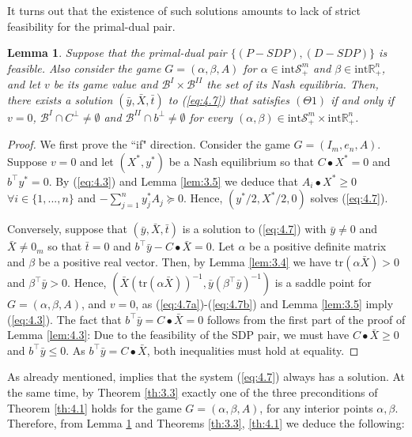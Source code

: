 \documentclass[11pt, twoside]{article}
\numberwithin{equation}{section}
\newtheorem{lemma}{Lemma}[section]
\theoremstyle{definition}
\begin{document}
It turns out that the existence of such solutions amounts to lack of strict feasibility for the primal-dual pair.

\begin{lemma}\label{lem:theta1}
    Suppose that the primal-dual pair \hyperlink{primaldualsdp}{$\{(P-SDP),(D-SDP)\}$} is feasible. Also consider the game $G=(\alpha,\beta,A)$ for $\alpha\in\text{int}\mathcal{S}^{m}_{+}$ and $\beta\in\text{int}\mathbb{R}^{n}_{+}$, and let $v$ be its game value and $\mathcal{B}^I\times\mathcal{B}^{II}$ the set of its Nash equilibria. Then, there exists a solution $(\bar{y},\bar{X},\bar{t})$ to (\ref{eq:4.7}) that satisfies \hyperlink{theta1}{$(\Theta1)$} if and only if $v=0$, $\mathcal{B}^I\cap C^{\perp}\neq\emptyset$ and $\mathcal{B}^{II}\cap b^{\perp}\neq\emptyset$ for every $(\alpha,\beta)\in \text{int}\mathcal{S}^{m}_{+}\times\text{int} \mathbb{R}^{n}_{+}$.
\end{lemma}

\begin{proof}
    We first prove the ``if" direction. Consider the game $G=(I_m,e_n,A)$. Suppose $v=0$ and let $(X^*,y^*)$ be a Nash equilibrium so that $C\bullet X^*=0$ and $b^\top y^*=0$. By (\ref{eq:4.3}) and Lemma \ref{lem:3.5} we deduce that $A_i\bullet X^*\geq 0$ $\forall i\in\{1,...,n\}$ and $-\sum\limits_{j=1}^{n} y^*_j A_j\succeq 0$. Hence, $(y^*/2,X^*/2,0)$ solves (\ref{eq:4.7}).\par 
    Conversely, suppose that $(\bar{y},\bar{X},\bar{t})$ is a solution to (\ref{eq:4.7})  with $\bar{y}\neq 0$ and $\bar{X}\neq 0_m$ so that $\bar{t}=0$ and $b^\top \bar{y}-C\bullet \bar{X}=0$. Let $\alpha$ be a positive definite matrix and $\beta$ be a positive real vector. Then, by Lemma \ref{lem:3.4} we have $\text{tr}(\alpha \bar{X})>0$ and $\beta^\top \bar{y}>0$. Hence, $\left(\bar{X}(\text{tr}(\alpha \bar{X}))^{-1},\bar{y} (\beta^\top\bar{y})^{-1}\right)$ is a saddle point for $G=(\alpha,\beta,A)$, and $v=0$, as (\ref{eq:4.7a})-(\ref{eq:4.7b}) and Lemma \ref{lem:3.5} imply (\ref{eq:4.3}). The fact that $b^\top\bar{y}=C\bullet \bar{X}=0$ follows from the first part of the proof of Lemma \ref{lem:4.3}: Due to the feasibility of the SDP pair, we must have $C\bullet \bar{X}\geq 0$ and $b^\top \bar{y}\leq 0$. As $b^\top \bar{y}= C\bullet \bar{X}$, both inequalities must hold at equality.
\end{proof}

As already mentioned, \cite[Lemma 5.2]{ickstadt2024semidefinite} implies that the system (\ref{eq:4.7}) always has a solution. At the same time, by Theorem \ref{th:3.3} exactly one of the three preconditions of Theorem \ref{th:4.1} holds for the game $G=(\alpha,\beta,A)$, for any interior points $\alpha,\beta$. Therefore, from Lemma \ref{lem:theta1} and Theorems \ref{th:3.3}, \ref{th:4.1} we deduce the following:
\end{document}
